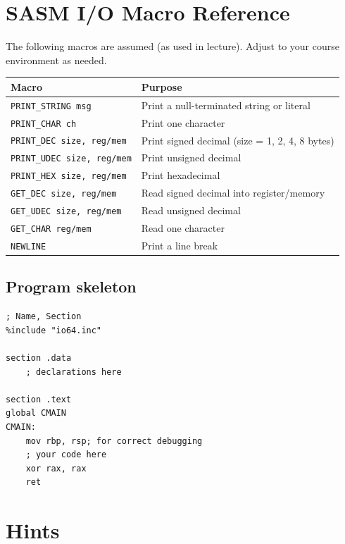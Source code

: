 \documentclass[11pt,letterpaper]{article}
\begin{document}
\newpage
\appendix
\section{SASM I/O Macro Reference}
\noindent The following macros are assumed (as used in lecture). Adjust to your course environment as needed.

\begin{center}
\begin{tabular}{@{}ll@{}}
\toprule
\textbf{Macro} & \textbf{Purpose} \\
\midrule
\texttt{PRINT\_STRING msg} & Print a null-terminated string or literal \\
\texttt{PRINT\_CHAR ch} & Print one character \\
\texttt{PRINT\_DEC size, reg/mem} & Print signed decimal (size = 1, 2, 4, 8 bytes) \\
\texttt{PRINT\_UDEC size, reg/mem} & Print unsigned decimal \\
\texttt{PRINT\_HEX size, reg/mem} & Print hexadecimal \\
\texttt{GET\_DEC size, reg/mem} & Read signed decimal into register/memory \\
\texttt{GET\_UDEC size, reg/mem} & Read unsigned decimal \\
\texttt{GET\_CHAR reg/mem} & Read one character \\
\texttt{NEWLINE} & Print a line break \\
\bottomrule
\end{tabular}
\end{center}

\subsection*{Program skeleton}
\begin{lstlisting}
; Name, Section
%include "io64.inc"

section .data
    ; declarations here

section .text
global CMAIN
CMAIN:
    mov rbp, rsp; for correct debugging
    ; your code here
    xor rax, rax
    ret
\end{lstlisting}

\newpage
\section{Hints}
\end{document}
